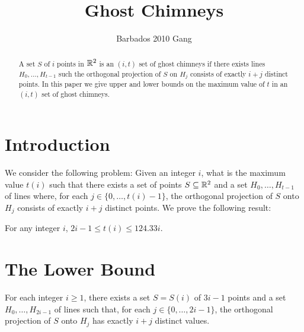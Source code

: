 \documentclass{patmorin}
\title{Ghost Chimneys}
\author{Barbados 2010 Gang}
\begin{document}
\maketitle

\begin{abstract}
A set $S$ of $i$ points in $\mathbb{R}^2$ is an $(i,t)$ set of ghost chimneys if
there exists lines $H_0,\ldots,H_{t-1}$ such the orthogonal projection
of $S$ on $H_j$ consists of exactly $i+j$ distinct points.  In this paper we give upper and lower bounds on the maximum value of $t$ in an $(i,t)$ set of ghost chimneys.
\end{abstract}

\section{Introduction}

We consider the following problem:  Given an integer $i$,
what is the maximum value $t(i)$ such that there exists a set of points
$S\subseteq\mathbb{R}^2$ and a set $H_0,\ldots,H_{t-1}$ of lines where, for
each $j\in\{0,\ldots,t(i)-1\}$, the orthogonal projection of $S$ onto $H_j$ consists of exactly $i+j$ distinct points.
We prove the following result:

\begin{thm}
For any integer $i$,  $ 2i -1 \le t(i) \le 124.33i$.
\end{thm}

\section{The Lower Bound}

\begin{lem}
For each integer $i\ge 1$, there exists a set $S=S(i)$ of $3i-1$
points and a set $H_0,\ldots,H_{2i-1}$ of lines such that, for each
$j\in\{0,\ldots,2i-1\}$, the orthogonal projection of $S$ onto $H_j$
has exactly $i+j$ distinct values.
\end{lem}
\end{document}
